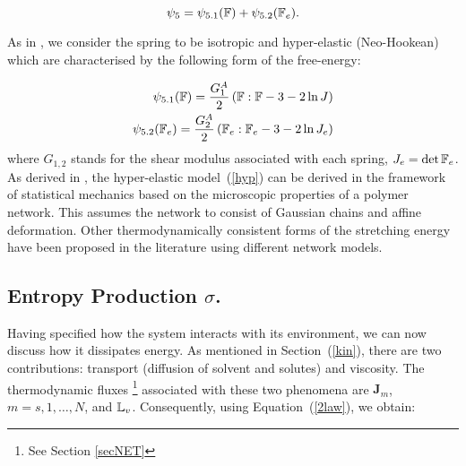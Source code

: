 \begin{equation}
\psi_5 = \psi_{5.1}(\mathbb{F}) + \psi_{5.2}(\mathbb{F}_e).
\end{equation}

As in \cite{ecm2}, we consider the spring to be isotropic and hyper-elastic (Neo-Hookean) which are characterised by the following form of the free-energy:

\begin{eqnarray}
\psi_{5.1}(\mathbb{F}) = \frac{G^A_1}{2} \left(\mathbb{F}:\mathbb{F} - 3 -2 \ln J\right)\\
\psi_{5.2}(\mathbb{F}_e) = \frac{G^A_2}{2} \left(\mathbb{F}_e:\mathbb{F}_e - 3 -2 \ln J_{e}\right)\label{hyp}
\end{eqnarray}
where $G_{1,2}$ stands for the shear modulus associated with each spring, $J_e= \det \mathbb{F}_e$. As derived in \cite{floryprinciples}, the hyper-elastic model~(\ref{hyp}) can be derived in the framework of statistical mechanics based on the microscopic properties of a polymer network. This assumes the network to consist of Gaussian chains and affine deformation. Other thermodynamically consistent forms of the stretching energy have been proposed in the literature \cite{BERGSTROM1998931,boyce2,doibook} using different network models.

\subsection{Entropy Production $\sigma$.}
\label{ent}

Having specified how the system interacts with its environment, we can now discuss how it dissipates energy. As mentioned in Section~(\ref{kin}), there are two contributions: transport (diffusion of solvent and solutes) and viscosity. The thermodynamic fluxes \footnote{See Section \ref{secNET}} associated with these two phenomena are $\mathbf{J}_m$, $m=s,1,\ldots,N$, and $\mathbb{L}_v$. Consequently, using Equation~(\ref{2law}), we obtain:

